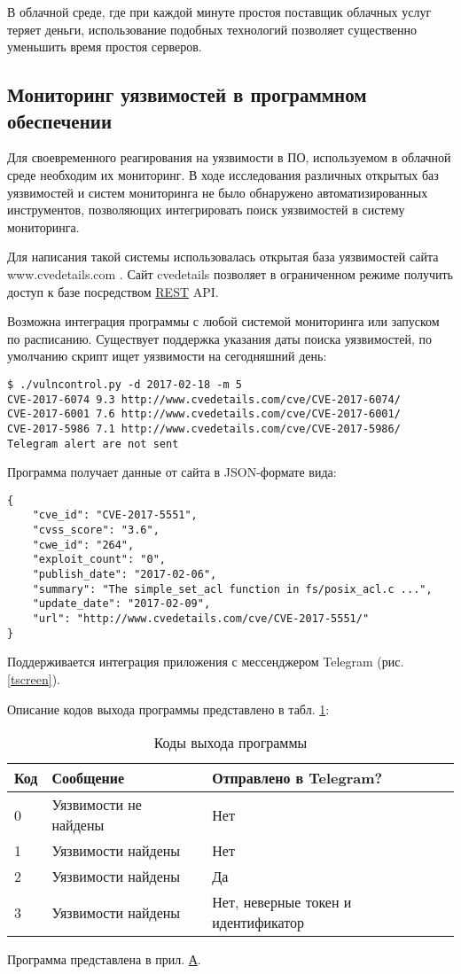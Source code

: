 В облачной среде, где при каждой минуте простоя поставщик облачных услуг теряет деньги, использование подобных технологий позволяет существенно уменьшить время простоя серверов.

\subsection{Мониторинг уязвимостей в программном обеспечении}

Для своевременного реагирования на уязвимости в ПО, используемом в облачной среде необходим их мониторинг.
В ходе исследования различных открытых баз уязвимостей и систем мониторинга не было обнаружено автоматизированных инструментов, позволяющих интегрировать поиск уязвимостей в систему мониторинга.

Для написания такой системы использовалась открытая база уязвимостей сайта www.cvedetails.com \cite{cvedetails}.
Сайт cvedetails позволяет в ограниченном режиме получить доступ к базе посредством \hyperlink{rest}{REST} API.

Возможна интеграция программы с любой системой мониторинга или запуском по расписанию.
Существует поддержка указания даты поиска уязвимостей, по умолчанию скрипт ищет уязвимости на сегодняшний день:
\begin{lstlisting}
$ ./vulncontrol.py -d 2017-02-18 -m 5
CVE-2017-6074 9.3 http://www.cvedetails.com/cve/CVE-2017-6074/
CVE-2017-6001 7.6 http://www.cvedetails.com/cve/CVE-2017-6001/
CVE-2017-5986 7.1 http://www.cvedetails.com/cve/CVE-2017-5986/
Telegram alert are not sent
\end{lstlisting}

Программа получает данные от сайта в JSON-формате вида:
\begin{lstlisting}
{
    "cve_id": "CVE-2017-5551",
    "cvss_score": "3.6",
    "cwe_id": "264",
    "exploit_count": "0",
    "publish_date": "2017-02-06",
    "summary": "The simple_set_acl function in fs/posix_acl.c ...",
    "update_date": "2017-02-09",
    "url": "http://www.cvedetails.com/cve/CVE-2017-5551/"
}
\end{lstlisting}


Поддерживается интеграция приложения с мессенджером Telegram (рис. \ref{tscreen}).


Описание кодов выхода программы представлено в табл. \ref{exitcodes}:
\begin{table}[H]
  \caption{Коды выхода программы}\label{exitcodes}
  \begin{tabular}{|l|l|l|}
  \hline Код & Сообщение & Отправлено в Telegram? \\
  \hline 0 & Уязвимости не найдены & Нет \\
  \hline 1 & Уязвимости найдены & Нет \\
  \hline 2 & Уязвимости найдены & Да \\
  \hline 3 & Уязвимости найдены & Нет, неверные токен и идентификатор \\
  \hline
  \end{tabular}
\end{table}

Программа представлена в прил. \hyperlink{app-a}{А}.

\clearpage
